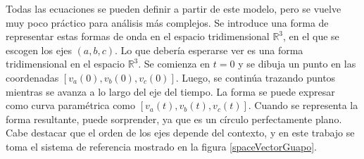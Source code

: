 Todas las ecuaciones se pueden definir a partir de este modelo, pero se vuelve muy poco práctico para análisis más complejos. Se introduce una forma de representar estas formas de onda en el espacio tridimensional $\mathbb{R}^3$, en el que se escogen los ejes \((a, b, c)\). Lo que debería esperarse ver es una forma tridimensional en el espacio $\mathbb{R}^3$. Se comienza en \(t = 0\) y se dibuja un punto en las coordenadas \([v_a(0), v_b(0), v_c(0)]\). Luego, se continúa trazando puntos mientras se avanza a lo largo del eje del tiempo. La forma se puede expresar como curva paramétrica como \([v_a(t), v_b(t), v_c(t)]\). Cuando se representa la forma resultante, puede sorprender, ya que es un círculo perfectamente plano. Cabe destacar que el orden de los ejes depende del contexto, y en este trabajo se toma el sistema de referencia mostrado en la figura \ref{spaceVectorGuapo}.


